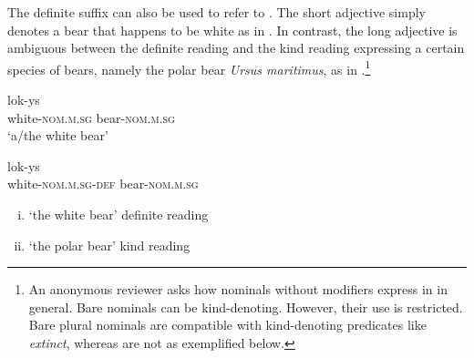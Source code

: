 \documentclass[output=paper,
modfonts
]{langscibook}
\begin{document}
The definite suffix can also be used to refer to  \citep{Rutkowski06}. The short adjective simply denotes a bear that happens to be white as in . \pagebreak In contrast, the long adjective is ambiguous between the definite reading and the kind reading expressing a certain species of bears, namely the polar bear \textit{Ursus maritimus}, as in .\footnote{An anonymous reviewer asks how nominals without modifiers express  in  in general. Bare nominals can be kind-denoting. However, their use is restricted. Bare plural nominals are compatible with kind-denoting predicates like \textit{extinct}, whereas  are not as exemplified below.
	
\ea {}

\z
\z}

\begin{exe}
\ex \label{ex:sereikaite:11}
\begin{xlist}
\ex \label{ex:sereikaite:11a}
 {lok-ys} \\
white-\textsc{nom.m.sg} bear-\textsc{nom.m.sg} \\
\trans `a/the white bear'  

\ex \label{ex:sereikaite:11b}
 {lok-ys}\\
white-\textsc{nom.m.sg}-\textsc{def} bear-\textsc{nom.m.sg}  \\
\trans 
\begin{enumerate}[(i)]
	\item `the white bear' \checkmark definite reading 
	\item `the polar bear' \checkmark kind reading
\end{enumerate}
 
\end{xlist}
\end{exe}
\end{document}
